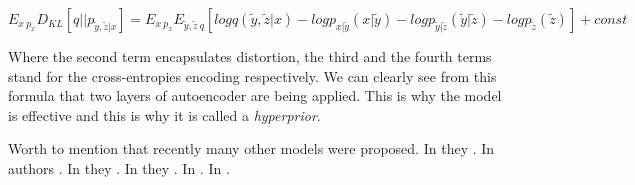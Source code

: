 \begin{equation}
    \label{eq:hyperprior}
    E_{x~p_x} D_{KL}[q || p_{\tilde{y},\tilde{z}|x}] = E_{x~p_x} E_{\tilde{y}, \tilde{z}~q} [log q(\tilde{y}, \tilde{z} | x) − log p_{x|\tilde{y}}(x | \tilde{y}) − log p_{\tilde{y}| \tilde{z}}(\tilde{y}|\tilde{z}) − log p_{\tilde{z}}(\tilde{z}) ] + const
\end{equation}

Where the second term encapsulates distortion, the third and the fourth terms stand for the cross-entropies encoding respectively. We can clearly see from this formula that two layers of autoencoder are being applied. This is why the model is effective and this is why it is called a \textit{hyperprior}.

Worth to mention that recently many other models were proposed. In \cite{zhou_end--end_nodate} they . In \cite{wang_substitutional_2021} authors . In \cite{lu_progressive_2021} they . In \cite{noauthor_view_nodate} they . In \cite{liu_unified_2020} . In \cite{mentzer_practical_2020}.
